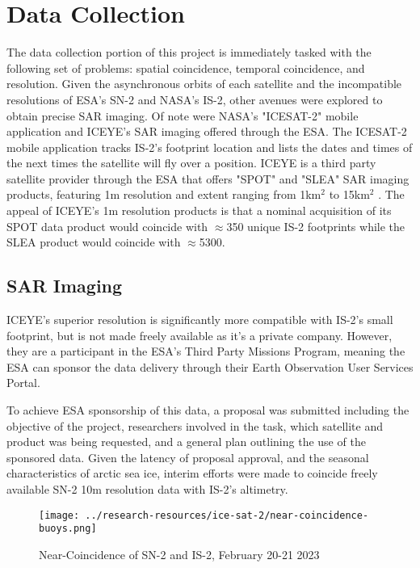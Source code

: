 \chapter{Data Collection}
\label{sec:Data_Collection}

The data collection portion of this project is immediately tasked with the following set of problems: spatial coincidence, temporal coincidence, and resolution. Given the asynchronous orbits of each satellite and the incompatible resolutions of ESA's SN-2 and NASA's IS-2, other avenues were explored to obtain precise SAR imaging. Of note were NASA's "ICESAT-2" mobile application and ICEYE's\textsuperscript{\tiny\textcopyright} SAR imaging offered through the ESA. The ICESAT-2 mobile application tracks IS-2's footprint location and lists the dates and times of the next times the satellite will fly over a position. ICEYE is a third party satellite provider through the ESA that offers "SPOT" and "SLEA" SAR imaging products, featuring 1m resolution and extent ranging from 1km$^2$ to 15km$^2$ \cite{iceye-products}. The appeal of ICEYE's 1m resolution products is that a nominal acquisition of its SPOT data product would coincide with $\approx$350 unique IS-2 footprints while the SLEA product would coincide with $\approx$5300.

\section {SAR Imaging}
ICEYE's superior resolution is significantly more compatible with IS-2's small footprint, but is not made freely available as it's a private company. However, they are a participant in the ESA's Third Party Missions Program, meaning the ESA can sponsor the data delivery through their Earth Observation User Services Portal. 

To achieve ESA sponsorship of this data, a proposal was submitted including the objective of the project, researchers involved in the task, which satellite and product was being requested, and a general plan outlining the use of the sponsored data. Given the latency of proposal approval, and the seasonal characteristics of arctic sea ice, interim efforts were made to coincide freely available SN-2 10m resolution data with IS-2's altimetry.

\begin{figure}[h]
    \centering
	\texttt{[image: ../research-resources/ice-sat-2/near-coincidence-buoys.png]}
    \label{near-coincidence}
    \caption{Near-Coincidence of SN-2 and IS-2, February 20-21 2023}
\end{figure}

